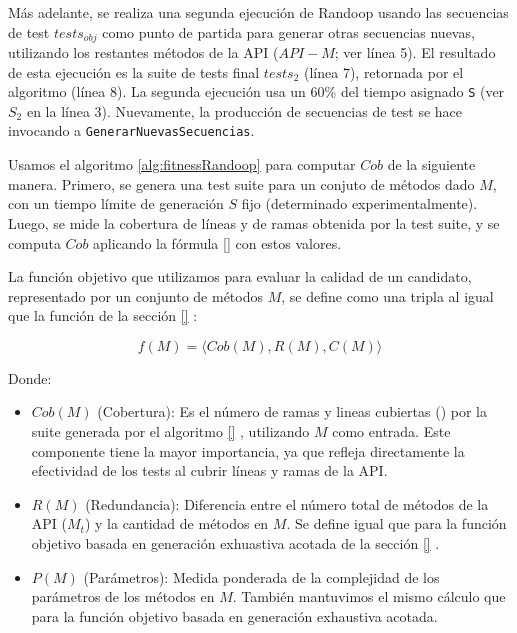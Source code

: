 Más adelante, se realiza una segunda ejecución
de Randoop usando las secuencias de test $tests_{obj}$ como punto de partida para
generar otras secuencias nuevas, utilizando los restantes métodos de la API
($API - M$; ver línea 5). El resultado de esta ejecución es la suite de tests final
$tests_2$ (línea 7), retornada por el algoritmo (línea 8).
La segunda ejecución usa un 60\% del tiempo
asignado \texttt{S} (ver $S_2$ en la línea 3). 
Nuevamente, la producción de secuencias de test se hace invocando a
\texttt{GenerarNuevasSecuencias}.


Usamos el algoritmo \ref{alg:fitnessRandoop} para computar $Cob$ de la siguiente manera.
Primero, se genera una test suite para un conjuto de métodos dado $M$, con un tiempo límite
de generación $S$ fijo (determinado experimentalmente). Luego, se mide  
 la cobertura de líneas y de ramas obtenida por la test suite, y se computa
 $Cob$ aplicando la fórmula \ref{}  con estos valores.

La función objetivo que utilizamos para evaluar la calidad de un candidato, 
representado por un conjunto de métodos $M$, se define como una tripla al igual 
que la función de la sección \ref{} :

\[
f(M) = \langle Cob(M), R(M), C(M) \rangle
\]

Donde:

\begin{itemize}
    \item $Cob(M)$ (Cobertura): Es el número de ramas y lineas cubiertas
        () por la
        suite generada por el algoritmo \ref{} , utilizando $M$ como
        entrada. 
    Este componente tiene la mayor importancia, ya que refleja directamente la
    efectividad de los tests al cubrir líneas y ramas de la API.
\item $R(M)$ (Redundancia): Diferencia entre el número total de métodos de la
    API ($M_t$) y la cantidad de métodos en $M$. Se define igual que para la
    función objetivo basada en generación exhuastiva acotada de la sección \ref{} .
    \item $P(M)$ (Parámetros): Medida ponderada de la complejidad de los
        parámetros de los métodos en $M$. También mantuvimos el mismo cálculo
        que para la función objetivo basada en generación exhaustiva acotada.
\end{itemize}

